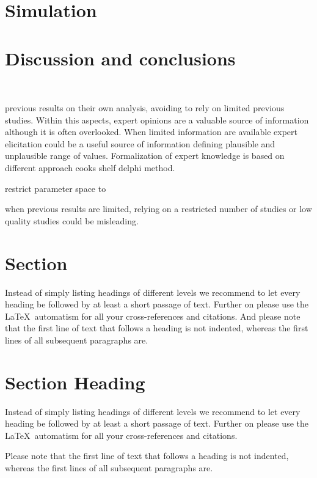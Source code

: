 \documentclass[graybox]{svmult}
\begin{document}
\section{Simulation}
\label{sec:simulation}

\section{Discussion and conclusions}
\label{sec:dicussion}

~

previous results on their own analysis, avoiding to rely on limited previous studies. Within this aspects, expert opinions are a valuable source of information although it is often overlooked.
When limited information are available expert elicitation could be a useful source of information defining plausible and unplausible range of values. Formalization of expert knowledge is based on different approach cooks shelf delphi method.

restrict parameter space to

when previous results are limited, relying on a restricted number of studies or low quality studies could be misleading.

\section{Section}

Instead of simply listing headings of different levels we recommend to
let every heading be followed by at least a short passage of text.
Further on please use the \LaTeX\ automatism for all your
cross-references and citations. And please note that the first line of
text that follows a heading is not indented, whereas the first lines of
all subsequent paragraphs are.

\section{Section Heading}
\label{sec:2}
Instead of simply listing headings of different levels we recommend to
let every heading be followed by at least a short passage of text.
Further on please use the \LaTeX\ automatism for all your
cross-references and citations.

Please note that the first line of text that follows a heading is not indented, whereas the first lines of all subsequent paragraphs are.
\end{document}
